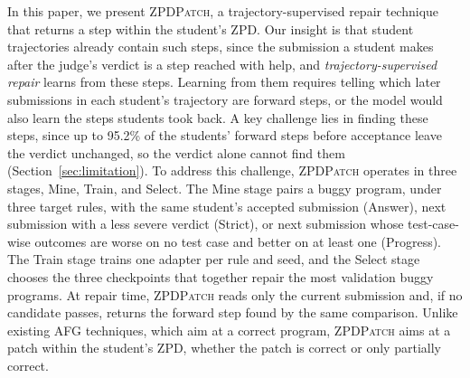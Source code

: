 \documentclass[conference]{IEEEtran}
\begin{document}
In this paper, we present \textsc{ZPDPatch}, a trajectory-supervised repair technique that returns a step within the student's ZPD. Our insight is that student trajectories already contain such steps, since the submission a student makes after the judge's verdict is a step reached with help, and \emph{trajectory-supervised repair} learns from these steps. Learning from them requires telling which later submissions in each student's trajectory are forward steps, or the model would also learn the steps students took back. A key challenge lies in finding these steps, since up to 95.2\% of the students' forward steps before acceptance leave the verdict unchanged, so the verdict alone cannot find them (Section~\ref{sec:limitation}). To address this challenge, \textsc{ZPDPatch} operates in three stages, Mine, Train, and Select. The Mine stage pairs a buggy program, under three target rules, with the same student's accepted submission (Answer), next submission with a less severe verdict (Strict), or next submission whose test-case-wise outcomes are worse on no test case and better on at least one (Progress). The Train stage trains one adapter per rule and seed, and the Select stage chooses the three checkpoints that together repair the most validation buggy programs. At repair time, \textsc{ZPDPatch} reads only the current submission and, if no candidate passes, returns the forward step found by the same comparison. Unlike existing AFG techniques, which aim at a correct program, \textsc{ZPDPatch} aims at a patch within the student's ZPD, whether the patch is correct or only partially correct.
\end{document}
